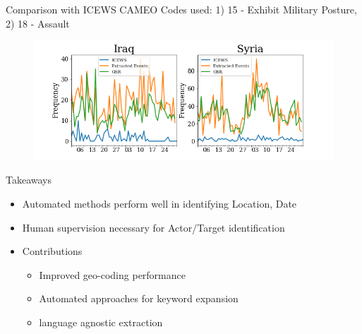 \begin{frame}{Comparison with ICEWS}
CAMEO Codes used: 1) 15 - Exhibit Military Posture,  2) 18 - Assault
\begin{figure}
    \centering
    \includegraphics[width=\textwidth]{Problem2/figures/ICEWS_comparison.png}
\end{figure}
    
\end{frame}

\begin{frame}{Takeaways}
\begin{itemize}
    \item Automated methods perform well in identifying Location, Date
    \item Human supervision necessary for Actor/Target identification
    \item Contributions
    \begin{itemize}
        \item Improved geo-coding performance
        \item Automated approaches for keyword expansion
        \item language agnostic extraction
    \end{itemize}
\end{itemize}
    
\end{frame}

